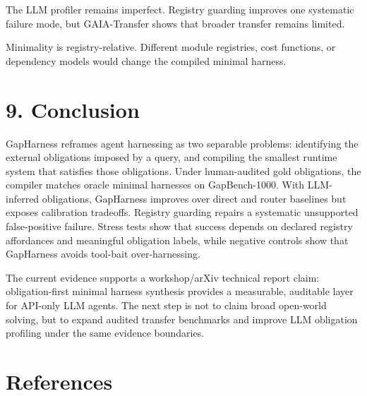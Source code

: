 \documentclass[
  10pt,
]{article}
\begin{document}
The LLM profiler remains imperfect. Registry guarding improves one
systematic failure mode, but GAIA-Transfer shows that broader transfer
remains limited.

Minimality is registry-relative. Different module registries, cost
functions, or dependency models would change the compiled minimal
harness.

\section{9. Conclusion}\label{conclusion}

GapHarness reframes agent harnessing as two separable problems:
identifying the external obligations imposed by a query, and compiling
the smallest runtime system that satisfies those obligations. Under
human-audited gold obligations, the compiler matches oracle minimal
harnesses on GapBench-1000. With LLM-inferred obligations, GapHarness
improves over direct and router baselines but exposes calibration
tradeoffs. Registry guarding repairs a systematic unsupported
false-positive failure. Stress tests show that success depends on
declared registry affordances and meaningful obligation labels, while
negative controls show that GapHarness avoids tool-bait over-harnessing.

The current evidence supports a workshop/arXiv technical report claim:
obligation-first minimal harness synthesis provides a measurable,
auditable layer for API-only LLM agents. The next step is not to claim
broad open-world solving, but to expand audited transfer benchmarks and
improve LLM obligation profiling under the same evidence boundaries.

\section*{References}\label{references}
\end{document}
